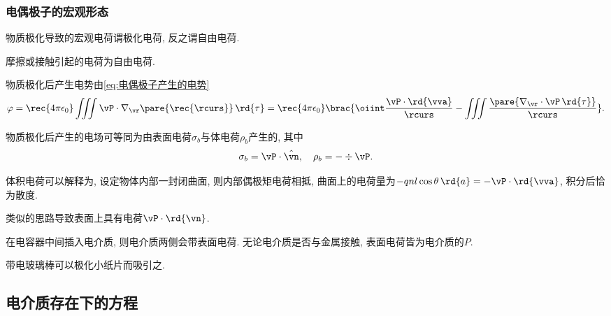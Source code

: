 \documentclass[../Electromagnetism.tex]{subfiles}
\begin{document}

\subsubsection{电偶极子的宏观形态} %
\label{ssub:电偶极子的宏观形态}

\begin{definition}[自由电荷与极化电荷]
	物质极化导致的宏观电荷谓极化电荷, 反之谓自由电荷.
\end{definition}
\begin{ex}
	摩擦或接触引起的电荷为自由电荷.
\end{ex}
物质极化后产生电势由\eqref{eq:电偶极子产生的电势}
\[ \varphi = \rec{4\pi\epsilon_0}\iiint \vP\cdot\nabla_{\vr}\pare{\rec{\rcurs}}\,\rd{\tau} = \rec{4\pi\epsilon_0}\brac{\oiint \frac{\vP \cdot \rd{\vva}}{\rcurs} - \iiint \frac{\pare{\nabla_{\vr}\cdot\vP\,\rd{\tau}}}{\rcurs}}. \]
\begin{finale}
	\begin{corollary}[极化表面电荷与体电荷]
		物质极化后产生的电场可等同为由表面电荷$\sigma_b$与体电荷$\rho_b$产生的, 其中
		\begin{equation}
			\label{eq:极化表面电荷与体电荷}
		 	\sigma_b = \vP\cdot\hat{\vn},\quad \rho_b = -\div\vP.
		 \end{equation}
	\end{corollary}
\end{finale}
\begin{ex}
	体积电荷可以解释为, 设定物体内部一封闭曲面, 则内部偶极矩电荷相抵, 曲面上的电荷量为$-qnl\cos\theta\,\rd{a} = -\vP\cdot\rd{\vva}$, 积分后恰为散度.
\end{ex}
\begin{ex}
	类似的思路导致表面上具有电荷$\vP\cdot\rd{\vn}$.
\end{ex}
\begin{ex}
	在电容器中间插入电介质, 则电介质两侧会带表面电荷. 无论电介质是否与金属接触, 表面电荷皆为电介质的$P$.
\end{ex}
\begin{ex}
	带电玻璃棒可以极化小纸片而吸引之.
\end{ex}



\subsection{电介质存在下的方程} %
\label{sub:电介质存在下的方程}
\end{document}
